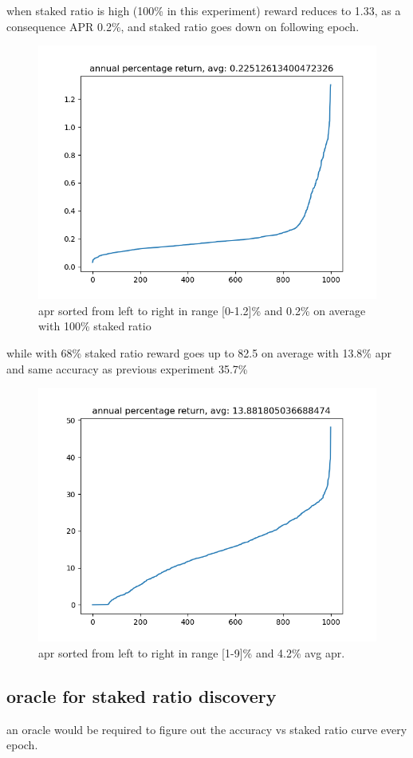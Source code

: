 \documentclass{article}
\begin{document}
\begin{description}
\item when staked ratio is high (100\% in this experiment) reward reduces to 1.33, as a consequence APR 0.2\%, and staked ratio goes down on following epoch.
  \begin{figure}
    \includegraphics{fullstake_apr.png}
    \caption{apr sorted from left to right in range [0-1.2]\% and 0.2\% on average with 100\% staked ratio}
  \end{figure}
\item while with 68\% staked ratio reward goes up to 82.5 on average with 13.8\% apr and same accuracy as previous experiment 35.7\%
  \begin{figure}
    \includegraphics{halfstake_apr.png}
    \caption{apr sorted from left to right in range [1-9]\% and 4.2\% avg apr.}
  \end{figure}

  \subsection {oracle for staked ratio discovery}
  an oracle would be required to figure out the accuracy vs staked ratio curve every epoch.

\end{description}
\end{document}
